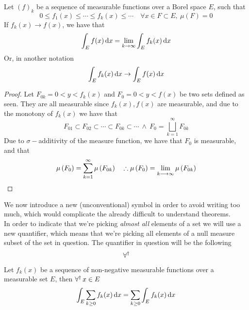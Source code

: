 \documentclass[../complete.tex]{subfiles}
\begin{document}
\begin{thm}
	Let $(f)_k$ be a sequence of measurable functions over a Borel space $E$, such that
	\begin{equation*}
		0\le f_1(x)\le\cdots\le f_k(x)\le\cdots\quad\forall x\in F\subset E,\ \mu(F)=0
	\end{equation*}
	If $f_k(x)\to f(x)$, we have that
	\begin{equation}
		\int_{E}^{}f(x)\operatorname{d\!} x=\lim_{k\to\infty}\int_{E}^{}f_k(x)\operatorname{d\!} x
		\label{eq:intconv}
	\end{equation}
	Or, in another notation
	\begin{equation}
		\int_{E}^{}f_k(x)\operatorname{d\!} x\to\int_{E}^{}f(x)\operatorname{d\!} x
		\label{eq:intconv2}
	\end{equation}
\end{thm}
\begin{proof}
	Let $F_{0k}={0<y<f_k(x)}$ and $F_{0}={0<y<f(x)}$ be two sets defined as seen. They are all measurable since $f_k(x),f(x)$ are measurable, and due to the monotony of $f_k(x)$ we have that
	\begin{equation*}
		F_{01}\subset F_{02}\subset\cdots\subset F_{0k}\subset\cdots\ \wedge\ F_0=\bigsqcup_{k=1}^\infty F_{0k}
	\end{equation*}
	Due to $\sigma-$additivity of the measure function, we have that $F_0$ is measurable, and that
	\begin{equation*}
		\mu\left( F_0 \right)=\sum_{k=1}^{\infty}\mu\left( F_{0k} \right)\quad\therefore\mu\left( F_0 \right)=\lim_{k\overset{}{\longrightarrow}\infty}\mu\left( F_{0k} \right)
	\end{equation*}
\end{proof}
\begin{ntn}
	We now introduce a new (unconventional) symbol in order to avoid writing too much, which would complicate the already difficult to understand theorems.\\
	In order to indicate that we're picking \textit{almost all} elements of a set we will use a new quantifier, which means that we're picking all elements of a null measure subset of the set in question. The quantifier in question will be the following
	\begin{equation}
		\operatorname{\forall^\dagger}
		\label{ntn:foralmostall}
	\end{equation}
\end{ntn}
\begin{cor}
	Let $f_k(x)$ be a sequence of non-negative measurable functions over a measurable set $E$, then $\operatorname{\forall^\dagger} x\in E$
	\begin{equation}
		\int_{E}^{}\sum_{k\ge0}f_k(x)\operatorname{d\!} x=\sum_{k\ge0}^{}\int_{E}^{}f_k(x)\operatorname{d\!} x
		\label{eq:sumintleb}
	\end{equation}
\end{cor}
\end{document}
